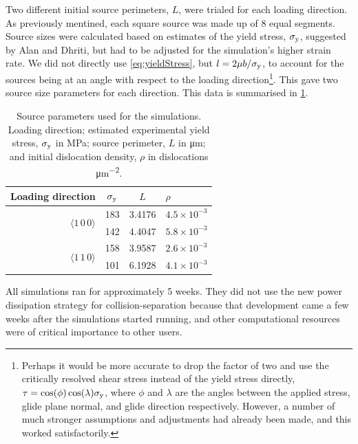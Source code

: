 Two different initial source perimeters, $L$, were trialed for each loading direction. As previously mentined, each square source was made up of 8 equal segments. Source sizes were calculated based on estimates of the yield stress, $\sigma_{\textrm{y}}$, suggested by Alan and Dhriti, but had to be adjusted for the simulation's higher strain rate. We did not directly use \cref{eq:yieldStress}, but $l = 2 \mu b / \sigma_{\textrm{y}}$, to account for the sources being at an angle with respect to the loading direction\footnote{Perhaps it would be more accurate to drop the factor of two and use the critically resolved shear stress instead of the yield stress directly, $\tau = \cos(\phi)\cos(\lambda) \sigma_{\textrm{y}}$, where $\phi$ and $\lambda$ are the angles between the applied stress, glide plane normal, and glide direction respectively. However, a number of much stronger assumptions and adjustments had already been made, and this worked satisfactorily.}. This gave two source size parameters for each direction. This data is summarised in \cref{t:sourceSize}.
\begin{table}
    \centering
    \caption{Source parameters used for the simulations. Loading direction; estimated experimental yield stress, $\sigma_{\textrm{y}}$ in \si{\mega\pascal}; source perimeter, $L$ in \si{\micro\metre}; and initial dislocation density, $\rho$ in dislocations \si{\micro\metre^{-2}}.}
    \label{t:sourceSize}
    \begin{tabular}{rccl}
        \toprule
        Loading direction                            & $\sigma_{\textrm{y}}$ & $L$    & $\rho$              \\
        \midrule
        \multirow{2}{*}{$\langle 1\, 0\, 0 \rangle$} & 183               & 3.4176 & $4.5\times 10^{-3}$ \\
                                                     & 142               & 4.4047 & $5.8\times 10^{-3}$ \\
        \midrule
        \multirow{2}{*}{$\langle 1\, 1\, 0 \rangle$} & 158               & 3.9587 & $2.6\times 10^{-3}$ \\
                                                     & 101               & 6.1928 & $4.1\times 10^{-3}$ \\
        \bottomrule
    \end{tabular}
\end{table}

All simulations ran for approximately 5 weeks. They did not use the new power dissipation strategy for collision-separation because that development came a few weeks after the simulations started running, and other computational resources were of critical importance to other users.

